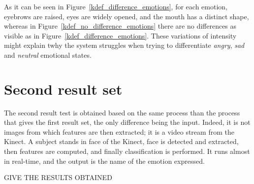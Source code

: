 \noindent As it can be seen in Figure~\ref{kdef_difference_emotions}, for each emotion, eyebrows are raised, eyes are widely opened, and the mouth has a distinct shape, whereas in Figure~\ref{kdef_no_difference_emotions} there are no differences as visible as in Figure~\ref{kdef_difference_emotions}. These variations of intensity might explain twhy the system struggles when trying to differentiate \textit{angry}, \textit{sad} and \textit{neutral} emotional states.
\newline

\section{Second result set}

\vspace{\baselineskip}
\noindent The second result test is obtained based on the same process than the process that gives the first result set, the only difference being the input. Indeed, it is not images from which features are then extracted; it is a video stream from the Kinect. A subject stands in face of the Kinect, face is detected and extracted, then features are computed, and finally classification is performed. It runs almost in real-time, and the output is the name of the emotion expressed.
\newline

\noindent GIVE THE RESULTS OBTAINED
\newline

